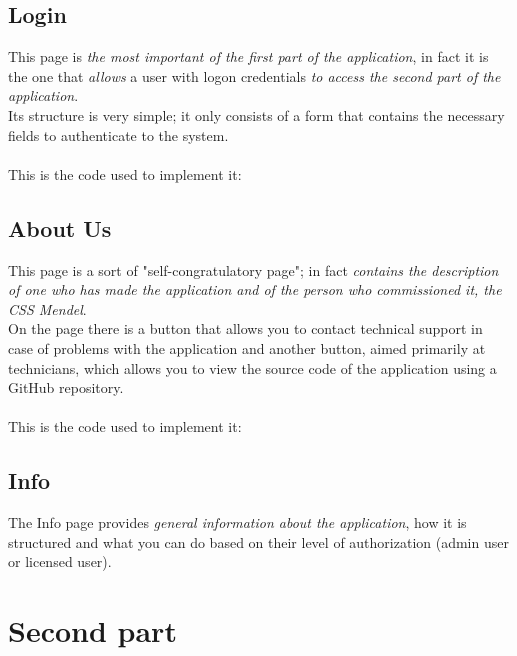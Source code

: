 


\subsection{Login}

This page is \emph{the most important of the first part of the application}, in fact it is the one that \emph{allows} a user with logon credentials \emph{to access the second part of the application}.
\\Its structure is very simple; it only consists of a form that contains the necessary fields to authenticate to the system.
\\
\\This is the code used to implement it:


	

\subsection{About Us}

This page is a sort of "self-congratulatory page"; in fact \emph{contains the description of one who has made ​​the application and of the person who commissioned it, the CSS Mendel}. 
\\On the page there is a button that allows you to contact technical support in case of problems with the application and another button, aimed primarily at technicians, which allows you to view the source code of the application using a GitHub repository. 
\\
\\This is the code used to implement it: 




\subsection{Info}

The Info page provides \emph{general information about the application}, how it is structured and what you can do based on their level of authorization (admin user or licensed user). 



\section{Second part}

